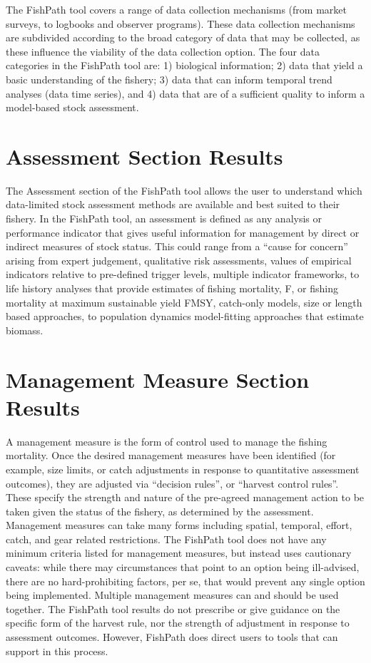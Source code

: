 \documentclass[11pt,]{book}
\begin{document}
The FishPath tool covers a range of data collection mechanisms (from
market surveys, to logbooks and observer programs). These data
collection mechanisms are subdivided according to the broad category of
data that may be collected, as these influence the viability of the data
collection option. The four data categories in the FishPath tool are: 1)
biological information; 2) data that yield a basic understanding of the
fishery; 3) data that can inform temporal trend analyses (data time
series), and 4) data that are of a sufficient quality to inform a
model-based stock assessment.

\hypertarget{assessment-section-results}{%
\section{Assessment Section Results}\label{assessment-section-results}}

The Assessment section of the FishPath tool allows the user to
understand which data-limited stock assessment methods are available and
best suited to their fishery. In the FishPath tool, an assessment is
defined as any analysis or performance indicator that gives useful
information for management by direct or indirect measures of stock
status. This could range from a ``cause for concern'' arising from
expert judgement, qualitative risk assessments, values of empirical
indicators relative to pre-defined trigger levels, multiple indicator
frameworks, to life history analyses that provide estimates of fishing
mortality, F, or fishing mortality at maximum sustainable yield FMSY,
catch-only models, size or length based approaches, to population
dynamics model-fitting approaches that estimate biomass.

\hypertarget{management-measure-section-results}{%
\section{Management Measure Section
Results}\label{management-measure-section-results}}

A management measure is the form of control used to manage the fishing
mortality. Once the desired management measures have been identified
(for example, size limits, or catch adjustments in response to
quantitative assessment outcomes), they are adjusted via ``decision
rules'', or ``harvest control rules''. These specify the strength and
nature of the pre-agreed management action to be taken given the status
of the fishery, as determined by the assessment. Management measures can
take many forms including spatial, temporal, effort, catch, and gear
related restrictions. The FishPath tool does not have any minimum
criteria listed for management measures, but instead uses cautionary
caveats: while there may circumstances that point to an option being
ill-advised, there are no hard-prohibiting factors, per se, that would
prevent any single option being implemented. Multiple management
measures can and should be used together. The FishPath tool results do
not prescribe or give guidance on the specific form of the harvest rule,
nor the strength of adjustment in response to assessment outcomes.
However, FishPath does direct users to tools that can support in this
process.
\end{document}
